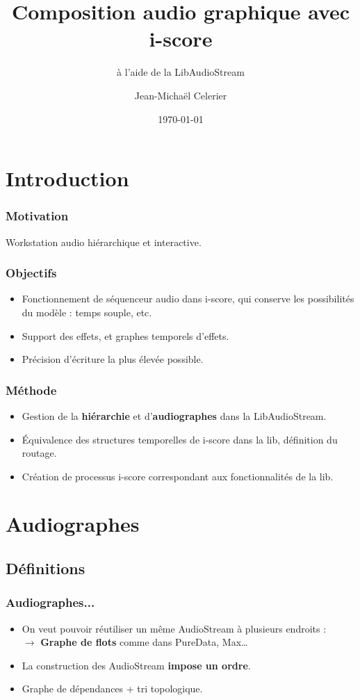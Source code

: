 \documentclass{beamer}
\title{Composition audio graphique avec i-score}
\subtitle{à l'aide de la LibAudioStream}
\date{\today}
\author{Jean-Michaël Celerier}
\institute{LaBRI, Blue Yeti}
\begin{document}
    
\maketitle
\begin{frame}
	\tableofcontents
\end{frame}
\section{Introduction}
\begin{frame}
    \frametitle{Motivation}    
    \Large
    Workstation audio hiérarchique et interactive.
\end{frame}

\begin{frame}
	\frametitle{Objectifs}    
	\Large
	\begin{itemize}
		\item<1-> Fonctionnement de séquenceur audio dans i-score, qui conserve les possibilités du modèle : temps souple, etc.
		\item<2-> Support des effets, et graphes temporels d'effets.
		\item<3-> Précision d'écriture la plus élevée possible.
	\end{itemize}    
\end{frame}

\begin{frame}
	\frametitle{Méthode}    
	\Large
	\begin{itemize}
		\item<1-> Gestion de la \textbf{hiérarchie} et d'\textbf{audiographes} dans la LibAudioStream\cite{letzlibaudiostream}.
		\item<2-> Équivalence des structures temporelles de i-score dans la lib, définition du routage.
		\item<3-> Création de processus i-score correspondant aux fonctionnalités de la lib.
	\end{itemize}    
\end{frame}

\section{Audiographes}
\subsection{Définitions}
\begin{frame}
	\frametitle{Audiographes...}    
	\Large
	\begin{itemize}
		\item On veut pouvoir réutiliser un même AudioStream à plusieurs endroits :  \\ $\rightarrow$ \textbf{Graphe de flots} comme dans PureData, Max\dots
		\item La construction des AudioStream \textbf{impose un ordre}.
		\item Graphe de dépendances + tri topologique.
	\end{itemize}    
\end{frame}
\end{document}

